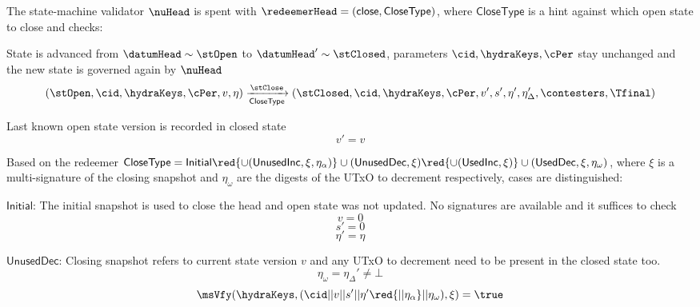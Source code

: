 \noindent The state-machine validator $\nuHead$ is spent with
$\redeemerHead = (\mathsf{close}, \mathsf{CloseType})$, where
$\mathsf{CloseType}$ is a hint against which open state to close and checks:
\begin{menumerate}
	\item State is advanced from $\datumHead \sim \stOpen$ to
	$\datumHead' \sim \stClosed$, parameters $\cid,\hydraKeys,\cPer$
	stay unchanged and the new state is governed again by $\nuHead$
	\[
    (\stOpen,\cid,\hydraKeys,\cPer,v,\eta) \xrightarrow[\mathsf{CloseType}]{\stClose} (\stClosed,\cid,\hydraKeys,\cPer,v',s',\eta', \eta_\Delta', \contesters,\Tfinal)
	\]
	\item Last known open state version is recorded in closed state
	\[
		v' = v
	\]

\item Based on the redeemer $\mathsf{CloseType} = \mathsf{Initial} \red{\cup (\mathsf{UnusedInc}, \xi, \eta_\alpha)} \cup (\mathsf{UnusedDec}, \xi) \red{\cup (\mathsf{UsedInc}, \xi)}  \cup (\mathsf{UsedDec}, \xi, \eta_\omega) $, where $\xi$ is a multi-signature of the closing snapshot  and $\eta_\omega$ are the digests of the UTxO to  decrement respectively,  cases are distinguished:
	\begin{menumerate}
		\item $\mathsf{Initial}$: The initial snapshot is used to close the head and open state was not updated. No signatures are available and it suffices to check
		\[
			v = 0
		\]
		\[
			s' = 0
		\]
		\[
			\eta' = \eta
		\]
		\item $\mathsf{UnusedDec}$: Closing snapshot refers to current state version $v$ and any UTxO to decrement need to be present in the closed state too.
		\[
			\eta_\omega = \eta_\Delta' \neq \bot
		\]
    \red{
		  \[
		  	\eta_\alpha = \bot
		  \]
    }
		\[
      \msVfy(\hydraKeys,(\cid || v || s' || \eta' \red{|| \eta_\alpha} || \eta_\omega),\xi) = \true
\]
\end{menumerate}
\end{menumerate}

